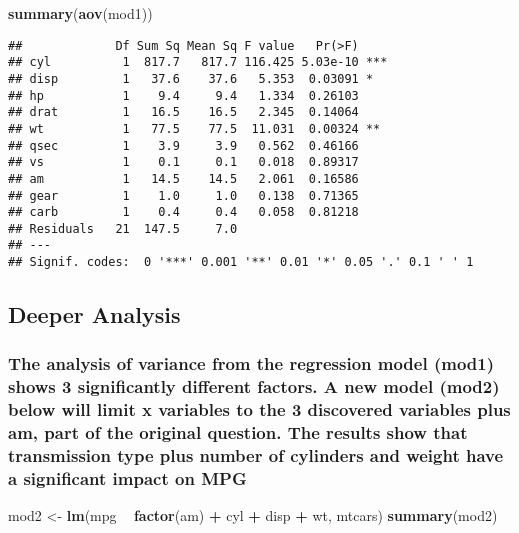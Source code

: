 \documentclass[]{article}
\newenvironment{Shaded}{\begin{snugshade}}{\end{snugshade}}
\newcommand{\KeywordTok}[1]{\textcolor[rgb]{0.13,0.29,0.53}{\textbf{#1}}}
\newcommand{\StringTok}[1]{\textcolor[rgb]{0.31,0.60,0.02}{#1}}
\newcommand{\OperatorTok}[1]{\textcolor[rgb]{0.81,0.36,0.00}{\textbf{#1}}}
\newcommand{\NormalTok}[1]{#1}
\begin{document}
\begin{Shaded}
\begin{Highlighting}[]
\KeywordTok{summary}\NormalTok{(}\KeywordTok{aov}\NormalTok{(mod1))}
\end{Highlighting}
\end{Shaded}

\begin{verbatim}
##             Df Sum Sq Mean Sq F value   Pr(>F)    
## cyl          1  817.7   817.7 116.425 5.03e-10 ***
## disp         1   37.6    37.6   5.353  0.03091 *  
## hp           1    9.4     9.4   1.334  0.26103    
## drat         1   16.5    16.5   2.345  0.14064    
## wt           1   77.5    77.5  11.031  0.00324 ** 
## qsec         1    3.9     3.9   0.562  0.46166    
## vs           1    0.1     0.1   0.018  0.89317    
## am           1   14.5    14.5   2.061  0.16586    
## gear         1    1.0     1.0   0.138  0.71365    
## carb         1    0.4     0.4   0.058  0.81218    
## Residuals   21  147.5     7.0                     
## ---
## Signif. codes:  0 '***' 0.001 '**' 0.01 '*' 0.05 '.' 0.1 ' ' 1
\end{verbatim}

\subsection{Deeper Analysis}\label{deeper-analysis}

\subsubsection{The analysis of variance from the regression model (mod1)
shows 3 significantly different factors. A new model (mod2) below will
limit x variables to the 3 discovered variables plus am, part of the
original question. The results show that transmission type plus number
of cylinders and weight have a significant impact on
MPG}\label{the-analysis-of-variance-from-the-regression-model-mod1-shows-3-significantly-different-factors.-a-new-model-mod2-below-will-limit-x-variables-to-the-3-discovered-variables-plus-am-part-of-the-original-question.-the-results-show-that-transmission-type-plus-number-of-cylinders-and-weight-have-a-significant-impact-on-mpg}

\begin{Shaded}
\begin{Highlighting}[]
\NormalTok{mod2 <-}\StringTok{ }\KeywordTok{lm}\NormalTok{(mpg }\OperatorTok{~}\StringTok{ }\KeywordTok{factor}\NormalTok{(am) }\OperatorTok{+}\StringTok{ }\NormalTok{cyl }\OperatorTok{+}\StringTok{ }\NormalTok{disp }\OperatorTok{+}\StringTok{ }\NormalTok{wt, mtcars)}
\KeywordTok{summary}\NormalTok{(mod2)}
\end{Highlighting}
\end{Shaded}
\end{document}
